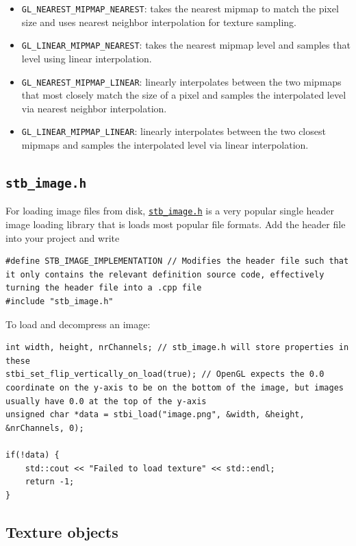 \documentclass[table, xcdraw]{article}%
\begin{document}
\begin{itemize}
    \item \texttt{GL_NEAREST_MIPMAP_NEAREST}: takes the nearest mipmap to match the pixel size and uses nearest neighbor interpolation for texture sampling.
    \item \texttt{GL_LINEAR_MIPMAP_NEAREST}: takes the nearest mipmap level and samples that level using linear interpolation.
    \item \texttt{GL_NEAREST_MIPMAP_LINEAR}: linearly interpolates between the two mipmaps that most closely match the size of a pixel and samples the interpolated level via nearest neighbor interpolation.
    \item \texttt{GL_LINEAR_MIPMAP_LINEAR}: linearly interpolates between the two closest mipmaps and samples the interpolated level via linear interpolation.
\end{itemize}

\subsection{\texttt{stb_image.h}}

For loading image files from disk, \href{https://github.com/nothings/stb/blob/master/stb_image.h}{\texttt{stb_image.h}} is a very popular single header image loading library that is loads most popular file formats. Add the header file into your project and write

\begin{verbatim}
#define STB_IMAGE_IMPLEMENTATION // Modifies the header file such that it only contains the relevant definition source code, effectively turning the header file into a .cpp file
#include "stb_image.h"
\end{verbatim}

To load and decompress an image:

\begin{verbatim}
int width, height, nrChannels; // stb_image.h will store properties in these
stbi_set_flip_vertically_on_load(true); // OpenGL expects the 0.0 coordinate on the y-axis to be on the bottom of the image, but images usually have 0.0 at the top of the y-axis
unsigned char *data = stbi_load("image.png", &width, &height, &nrChannels, 0);

if(!data) {
    std::cout << "Failed to load texture" << std::endl;
    return -1;
}
\end{verbatim}

\subsection{Texture objects}
\end{document}

